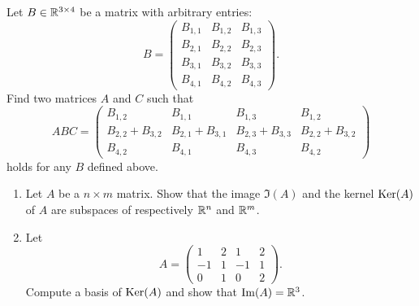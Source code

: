 \documentclass[11pt,nocut]{article}
\begin{document}
\begin{problem}[2 points]
	Let $B \in \mathbb{R}^{3 \times 4}$ be a matrix with arbitrary entries:
	$$
	B = 
	\begin{pmatrix}
		B_{1,1} & B_{1,2} & B_{1,3}\\
		B_{2,1} & B_{2,2} & B_{2,3}\\
		B_{3,1} & B_{3,2} & B_{3,3}\\
		B_{4,1} & B_{4,2} & B_{4,3}
	\end{pmatrix}.
	$$
	Find two matrices $A$ and $C$ such that
	$$
	A B C = 
	\begin{pmatrix}
		B_{1,2} & B_{1,1} & B_{1,3} & B_{1,2} \\
		B_{2,2} + B_{3,2} & B_{2,1} + B_{3,1} & B_{2,3} + B_{3,3} & B_{2,2} + B_{3,2} \\
		B_{4,2} & B_{4,1} & B_{4,3} & B_{4,2}
	\end{pmatrix}
	$$
	holds for any $B$ defined above.
\end{problem}
\vspace{5mm}

\begin{problem}[3 points]\leavevmode
	\begin{enumerate}[label=\normalfont(\textbf{\alph*})]
		\item Let $A$ be a $n \times m$ matrix. Show that the image $\Im(A)$ and the kernel ${{\rm Ker}}(A)$ of $A$ are subspaces of respectively $\mathbb{R}^n$ and $\mathbb{R}^m$.
		\item Let
			$$
			A = 
			\begin{pmatrix}
				1 & 2 & 1 & 2 \\
				-1 & 1 & -1 & 1 \\
				0 & 1 & 0 & 2 
			\end{pmatrix}.
			$$
			Compute a basis of ${{\rm Ker}}(A)$ and show that ${{\rm Im}}(A) = \mathbb{R}^3$.
	\end{enumerate}
\end{problem}
\end{document}
